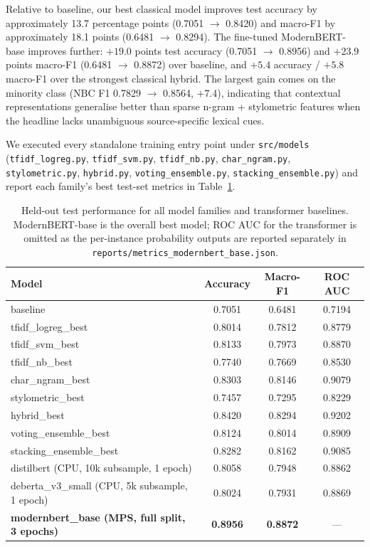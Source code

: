 \documentclass[10pt]{article}
\begin{document}
Relative to baseline, our best classical model improves test accuracy by approximately 13.7 percentage points (0.7051 $\rightarrow$ 0.8420) and macro-F1 by approximately 18.1 points (0.6481 $\rightarrow$ 0.8294). The fine-tuned ModernBERT-base improves further: $+19.0$ points test accuracy (0.7051 $\rightarrow$ 0.8956) and $+23.9$ points macro-F1 (0.6481 $\rightarrow$ 0.8872) over baseline, and $+5.4$ accuracy / $+5.8$ macro-F1 over the strongest classical hybrid. The largest gain comes on the minority class (NBC F1 0.7829 $\rightarrow$ 0.8564, $+7.4$), indicating that contextual representations generalise better than sparse n-gram + stylometric features when the headline lacks unambiguous source-specific lexical cues.

We executed every standalone training entry point under \texttt{src/models} (\texttt{tfidf\_logreg.py}, \texttt{tfidf\_svm.py}, \texttt{tfidf\_nb.py}, \texttt{char\_ngram.py}, \texttt{stylometric.py}, \texttt{hybrid.py}, \texttt{voting\_ensemble.py}, \texttt{stacking\_ensemble.py}) and report each family's best test-set metrics in Table~\ref{tab:results}.

\begin{table}[h]
\centering
\small
\begin{tabular}{lccc}
\hline
Model & Accuracy & Macro-F1 & ROC AUC \\
\hline
baseline & 0.7051 & 0.6481 & 0.7194 \\
tfidf\_logreg\_best & 0.8014 & 0.7812 & 0.8779 \\
tfidf\_svm\_best & 0.8133 & 0.7973 & 0.8870 \\
tfidf\_nb\_best & 0.7740 & 0.7669 & 0.8530 \\
char\_ngram\_best & 0.8303 & 0.8146 & 0.9079 \\
stylometric\_best & 0.7457 & 0.7295 & 0.8229 \\
hybrid\_best & 0.8420 & 0.8294 & 0.9202 \\
voting\_ensemble\_best & 0.8124 & 0.8014 & 0.8909 \\
stacking\_ensemble\_best & 0.8282 & 0.8162 & 0.9085 \\
distilbert (CPU, 10k subsample, 1 epoch) & 0.8058 & 0.7948 & 0.8862 \\
deberta\_v3\_small (CPU, 5k subsample, 1 epoch) & 0.8024 & 0.7931 & 0.8869 \\
\textbf{modernbert\_base (MPS, full split, 3 epochs)} & \textbf{0.8956} & \textbf{0.8872} & --- \\
\hline
\end{tabular}
\caption{Held-out test performance for all model families and transformer baselines. ModernBERT-base is the overall best model; ROC AUC for the transformer is omitted as the per-instance probability outputs are reported separately in \texttt{reports/metrics\_modernbert\_base.json}.}
\label{tab:results}
\end{table}
\end{document}
